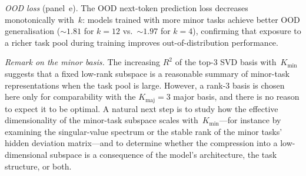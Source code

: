 \emph{OOD loss} (panel~e).
The OOD next-token prediction loss decreases monotonically with~$k$: models
trained with more minor tasks achieve better OOD generalisation
(${\sim}1.81$ for $k = 12$ vs.\ ${\sim}1.97$ for $k = 4$), confirming that
exposure to a richer task pool during training improves out-of-distribution
performance.

\emph{Remark on the minor basis.}
The increasing $R^2$ of the top-3 SVD basis with~$K_{\mathrm{min}}$ suggests
that a fixed low-rank subspace is a reasonable summary of minor-task
representations when the task pool is large.
However, a rank-3 basis is chosen here only for comparability with the
$K_{\mathrm{maj}} = 3$ major basis, and there is no reason to expect it to be
optimal.
A natural next step is to study how the effective dimensionality of the
minor-task subspace scales with~$K_{\mathrm{min}}$---for instance by examining
the singular-value spectrum or the stable rank of the minor tasks' hidden
deviation matrix---and to determine whether the compression into a
low-dimensional subspace is a consequence of the model's architecture, the
task structure, or both.

